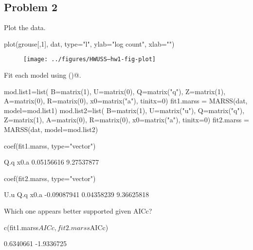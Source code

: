 \subsection*{Problem 2}
\begin{wideenumerate}
\item Plot the data.
\begin{Schunk}
\begin{Sinput}
 plot(grouse[,1], dat, type="l", ylab="log count", xlab="")
\end{Sinput}
\end{Schunk}
\begin{figure}[htp]
\begin{center}
\texttt{[image: ../figures/HWUSS--hw1-fig-plot]}
\end{center}
\end{figure}
\item Fit each model using \verb@MARSS()@.
\begin{Schunk}
\begin{Sinput}
 mod.list1=list(
   B=matrix(1), U=matrix(0), Q=matrix("q"),
   Z=matrix(1), A=matrix(0), R=matrix(0),
   x0=matrix("a"), tinitx=0)
 fit1.marss = MARSS(dat, model=mod.list1)
 mod.list2=list(
   B=matrix(1), U=matrix("u"), Q=matrix("q"),
   Z=matrix(1), A=matrix(0), R=matrix(0),
   x0=matrix("a"), tinitx=0)
 fit2.marss = MARSS(dat, model=mod.list2)
\end{Sinput}
\end{Schunk}
\begin{Schunk}
\begin{Sinput}
 coef(fit1.marss, type="vector")
\end{Sinput}
\begin{Soutput}
       Q.q       x0.a 
0.05156616 9.27537877 
\end{Soutput}
\begin{Sinput}
 coef(fit2.marss, type="vector")
\end{Sinput}
\begin{Soutput}
        U.u         Q.q        x0.a 
-0.09087941  0.04358239  9.36625818 
\end{Soutput}
\end{Schunk}
\item Which one appears better supported given AICc?
\begin{Schunk}
\begin{Sinput}
 c(fit1.marss$AICc, fit2.marss$AICc)
\end{Sinput}
\begin{Soutput}
[1]  0.6340661 -1.9336725

\end{Soutput}
\end{Schunk}
\end{wideenumerate}
